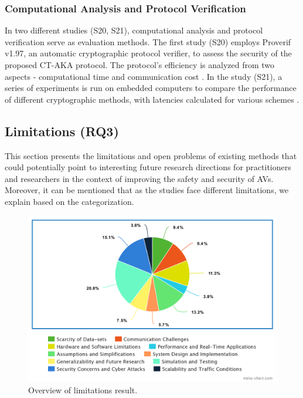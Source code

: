 \documentclass[a4paper,12pt]{article}
\begin{document}
\subsubsection{Computational Analysis and Protocol Verification}
\hspace{5mm} In two different studies (S20, S21), computational analysis and protocol verification serve as evaluation methods. The first study (S20) employs Proverif v1.97, an automatic cryptographic protocol verifier, to assess the security of the proposed CT-AKA protocol. The protocol’s efficiency is analyzed from two aspects - computational time and communication cost \cite{s20}. In the study (S21), a series of experiments is run on embedded computers to compare the performance of different cryptographic methods, with latencies calculated for various schemes \cite{s21}.

\newpage

\subsection{Limitations (RQ3)}
\hspace{5mm} This section presents the limitations and open problems of existing methods that could potentially point to interesting future research directions for practitioners and researchers in the context of improving the safety and security of AVs. Moreover, it can be mentioned that as the studies face different limitations, we explain based on the categorization.

\begin{figure}[H]
  \centering
  \includegraphics*[width=1.1\columnwidth]{img/Overview of limitations result}
  \caption{Overview of limitations result.}   \label{fig:Overview of limitations result}
\end{figure}
\end{document}
